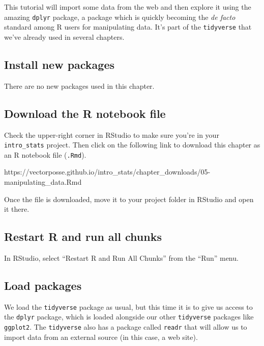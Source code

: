 \documentclass[
]{book}
\begin{document}
This tutorial will import some data from the web and then explore it using the amazing \texttt{dplyr} package, a package which is quickly becoming the \emph{de facto} standard among R users for manipulating data. It's part of the \texttt{tidyverse} that we've already used in several chapters.

\hypertarget{manipulating-install}{%
\subsection{Install new packages}\label{manipulating-install}}

There are no new packages used in this chapter.

\hypertarget{manipulating-download}{%
\subsection{Download the R notebook file}\label{manipulating-download}}

Check the upper-right corner in RStudio to make sure you're in your \texttt{intro\_stats} project. Then click on the following link to download this chapter as an R notebook file (\texttt{.Rmd}).

https://vectorposse.github.io/intro\_stats/chapter\_downloads/05-manipulating\_data.Rmd

Once the file is downloaded, move it to your project folder in RStudio and open it there.

\hypertarget{manipulating-restart}{%
\subsection{Restart R and run all chunks}\label{manipulating-restart}}

In RStudio, select ``Restart R and Run All Chunks'' from the ``Run'' menu.

\hypertarget{manipulating-load}{%
\subsection{Load packages}\label{manipulating-load}}

We load the \texttt{tidyverse} package as usual, but this time it is to give us access to the \texttt{dplyr} package, which is loaded alongside our other \texttt{tidyverse} packages like \texttt{ggplot2}. The \texttt{tidyverse} also has a package called \texttt{readr} that will allow us to import data from an external source (in this case, a web site).
\end{document}

